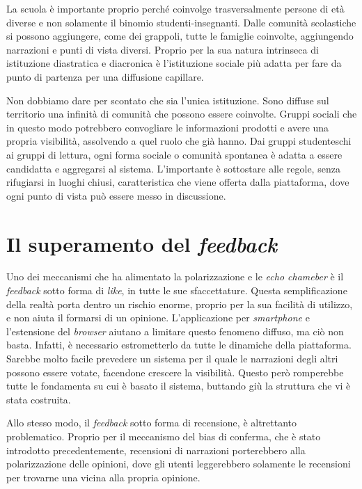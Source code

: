 \documentclass{article}
\begin{document}
 La scuola è importante proprio perché coinvolge trasversalmente persone di età diverse e non solamente il binomio studenti-insegnanti. Dalle comunità scolastiche si possono aggiungere, come dei grappoli, tutte le famiglie coinvolte, aggiungendo narrazioni e punti di vista diversi. Proprio per la sua natura intrinseca di istituzione diastratica e diacronica è l’istituzione sociale più adatta per fare da punto di partenza per una diffusione capillare. 
 
 Non dobbiamo dare per scontato che sia l’unica istituzione. Sono diffuse sul territorio una infinità di comunità che possono essere coinvolte. Gruppi sociali che in questo modo potrebbero convogliare le informazioni prodotti e avere una propria visibilità, assolvendo a quel ruolo che già hanno. Dai gruppi studenteschi ai gruppi di lettura, ogni forma sociale o  comunità spontanea è adatta a essere candidatta e aggregarsi al sistema. L’importante è sottostare alle regole, senza rifugiarsi in luoghi chiusi, caratteristica che viene offerta dalla piattaforma, dove ogni punto di vista può essere messo in discussione.

\section{Il superamento del \textit{feedback}}
\label{sec:sup-feed}

Uno dei meccanismi che ha alimentato la polarizzazione e le \textit{echo chameber} è il \textit{feedback} sotto forma di \textit{like}, in tutte le sue sfaccettature. Questa semplificazione della realtà porta dentro un rischio enorme, proprio per la sua facilità di utilizzo, e non aiuta il formarsi di un opinione. L’applicazione per \textit{smartphone} e l’estensione del \textit{browser} aiutano a limitare questo fenomeno diffuso, ma ciò non basta. Infatti, è necessario estrometterlo da tutte le dinamiche della piattaforma. Sarebbe molto facile prevedere un sistema per il quale le narrazioni degli altri possono essere votate, facendone crescere la visibilità. Questo però romperebbe tutte le fondamenta su cui è basato il sistema, buttando giù la struttura che vi è stata costruita. 

Allo stesso modo, il \textit{feedback} sotto forma di recensione, è altrettanto problematico. Proprio per il meccanismo del bias di conferma, che è stato introdotto precedentemente, recensioni di narrazioni porterebbero alla polarizzazione delle opinioni, dove gli utenti leggerebbero solamente le recensioni per trovarne una vicina alla propria opinione. 
\end{document}
